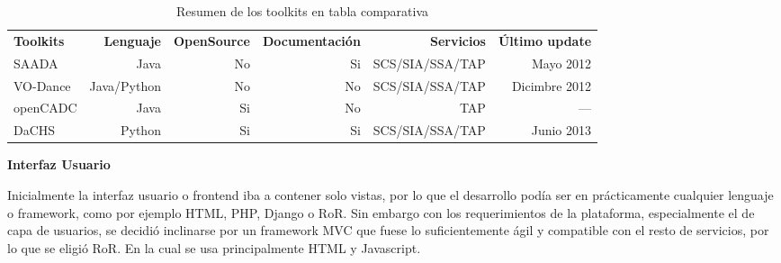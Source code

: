 \begin{table}[h!t]
\centering
\begin{tabular}{lrrrrr}
    {\bf Toolkits} & {\bf Lenguaje} & {\bf OpenSource} & {\bf Documentación} & {\bf Servicios} & {\bf Último update}  \\
    SAADA          & Java           & No               & Si                  & SCS/SIA/SSA/TAP & Mayo 2012     \\
    VO-Dance       & Java/Python    & No               & No                  & SCS/SIA/SSA/TAP & Dicimbre 2012 \\
    openCADC       & Java           & Si               & No                  & TAP             & ---           \\
    DaCHS          & Python         & Si               & Si                  & SCS/SIA/SSA/TAP & Junio 2013    \\
\end{tabular}
\caption{Resumen de los toolkits en tabla comparativa}
\label{table:toolkits}
\end{table}

\textbf{Interfaz Usuario}

Inicialmente la interfaz usuario o frontend iba a contener solo vistas, por lo que
el desarrollo podía ser en prácticamente cualquier lenguaje o framework, como por
ejemplo HTML, PHP, Django o RoR. Sin embargo con los requerimientos de la
plataforma, especialmente el de capa de usuarios, se decidió inclinarse por un
framework MVC que fuese lo suficientemente ágil y compatible con el resto de
servicios, por lo que se eligió RoR. En la cual se usa principalmente HTML y
Javascript.
